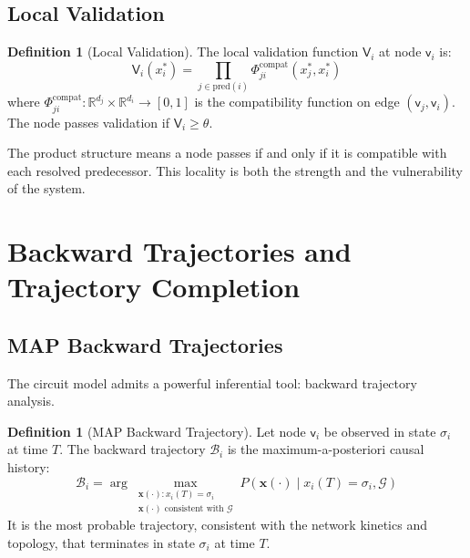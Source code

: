 \documentclass[10pt,twocolumn,a4paper]{article}
\theoremstyle{plain}
\theoremstyle{definition}
\newtheorem{definition}[theorem]{Definition}
\theoremstyle{remark}
\newcommand{\fnode}{\mathsf{v}}
\newcommand{\circuit}{\mathcal{G}}
\newcommand{\valid}{\mathsf{V}}
\newcommand{\R}{\mathbb{R}}
\newcommand{\Back}{\mathcal{B}}
\begin{document}
\subsection{Local Validation}

\begin{definition}[Local Validation]
\label{def:validation}
The local validation function $\valid_i$ at node $\fnode_i$ is:
\begin{equation}
    \valid_i(x_i^*) = \prod_{j \in \mathrm{pred}(i)} \Phi_{ji}^{\mathrm{compat}}(x_j^*, x_i^*)
    \label{eq:validation}
\end{equation}
where $\Phi_{ji}^{\mathrm{compat}}: \R^{d_j} \times \R^{d_i} \to [0,1]$ is the compatibility function on edge $(\fnode_j, \fnode_i)$. The node passes validation if $\valid_i \geq \theta$.
\end{definition}

The product structure means a node passes if and only if it is compatible with each resolved predecessor. This locality is both the strength and the vulnerability of the system.


\section{Backward Trajectories and Trajectory Completion}
\label{sec:algorithm}

\subsection{MAP Backward Trajectories}

The circuit model admits a powerful inferential tool: backward trajectory analysis.

\begin{definition}[MAP Backward Trajectory]
\label{def:backward}
Let node $\fnode_i$ be observed in state $\sigma_i$ at time $T$. The backward trajectory $\Back_i$ is the maximum-a-posteriori causal history:
\begin{equation}
    \Back_i = \arg\max_{\substack{\mathbf{x}(\cdot) : x_i(T) = \sigma_i \\ \mathbf{x}(\cdot) \text{ consistent with } \circuit}} P(\mathbf{x}(\cdot) \mid x_i(T) = \sigma_i, \circuit)
\end{equation}
It is the most probable trajectory, consistent with the network kinetics and topology, that terminates in state $\sigma_i$ at time $T$.
\end{definition}
\end{document}
